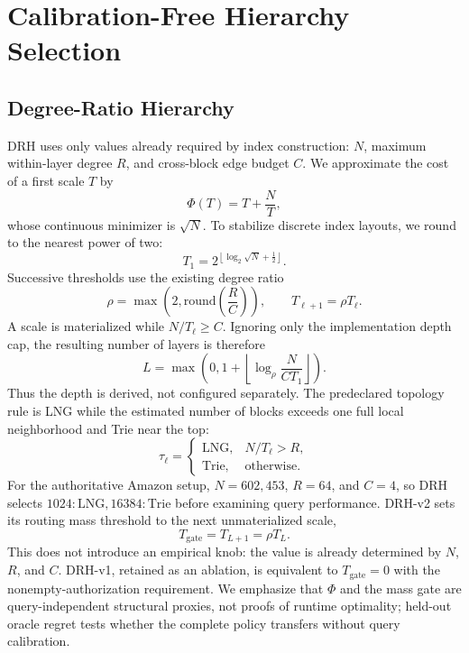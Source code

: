 \documentclass[sigconf,review,anonymous]{acmart}
\begin{document}
\section{Calibration-Free Hierarchy Selection}
\subsection{Degree-Ratio Hierarchy}
DRH uses only values already required by index construction: $N$, maximum
within-layer degree $R$, and cross-block edge budget $C$.  We approximate the
cost of a first scale $T$ by
\begin{equation}
  \Phi(T)=T+\frac{N}{T},
\end{equation}
whose continuous minimizer is $\sqrt{N}$.  To stabilize discrete index layouts,
we round to the nearest power of two:
\begin{equation}
  T_1=2^{\left\lfloor \log_2\sqrt{N}+\frac{1}{2}\right\rfloor}.
\end{equation}
Successive thresholds use the existing degree ratio
\begin{equation}
  \rho=\max\left(2,\mathrm{round}\left(\frac{R}{C}\right)\right),
  \qquad T_{\ell+1}=\rho T_\ell.
\end{equation}
A scale is materialized while $N/T_\ell\ge C$.  Ignoring only the implementation
depth cap, the resulting number of layers is therefore
\begin{equation}
  L=\max\left(0,
    1+\left\lfloor\log_\rho\frac{N}{C T_1}\right\rfloor\right).
\end{equation}
Thus the depth is derived, not configured separately.  The predeclared topology rule is LNG while the
estimated number of blocks exceeds one full local neighborhood and Trie near
the top:
\begin{equation}
  \tau_\ell=\begin{cases}
    \mathrm{LNG}, & N/T_\ell>R,\\
    \mathrm{Trie}, & \text{otherwise.}
  \end{cases}
\end{equation}
For the authoritative Amazon setup, $N=602{,}453$, $R=64$, and $C=4$, so DRH
selects $1024{:}\mathrm{LNG},16384{:}\mathrm{Trie}$ before examining query
performance. DRH-v2 sets its routing mass threshold to the next unmaterialized
scale,
\begin{equation}
  T_{\mathrm{gate}}=T_{L+1}=\rho T_L.
\end{equation}
This does not introduce an empirical knob: the value is already determined by
$N$, $R$, and $C$. DRH-v1, retained as an ablation, is equivalent to
$T_{\mathrm{gate}}=0$ with the nonempty-authorization requirement. We
emphasize that $\Phi$ and the mass gate are query-independent structural
proxies, not proofs of runtime optimality; held-out oracle regret tests whether
the complete policy transfers without query calibration.
\end{document}
